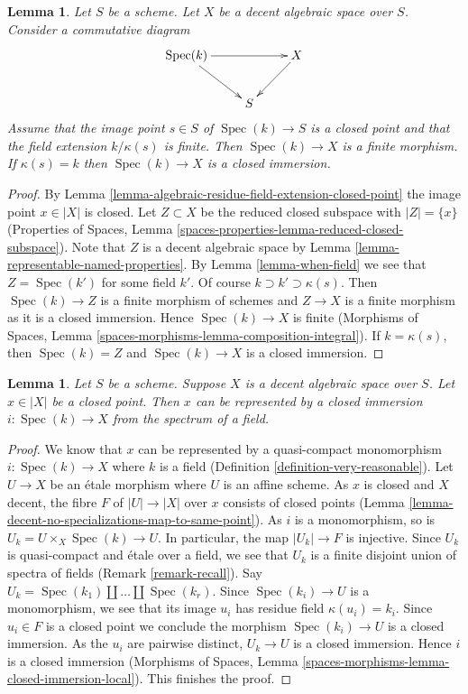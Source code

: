 \documentclass{stacks-project}
\theoremstyle{plain}
\newtheorem{lemma}[subsection]{Lemma}
\theoremstyle{definition}
\theoremstyle{remark}
\numberwithin{equation}{subsection}
\def\Spec{\mathop{\mathrm{Spec}}}
\begin{document}
\begin{lemma}
\label{lemma-finite-residue-field-extension-finite}
Let $S$ be a scheme. Let $X$ be a decent algebraic space over $S$.
Consider a commutative diagram
$$
\xymatrix{
\Spec(k) \ar[rr] \ar[rd] & & X \ar[ld] \\
& S
}
$$
Assume that the image point $s \in S$ of $\Spec(k) \to S$ is
a closed point and that the field extension $k/\kappa(s)$ is finite.
Then $\Spec(k) \to X$ is a finite morphism. If $\kappa(s) = k$
then $\Spec(k) \to X$ is a closed immersion.
\end{lemma}

\begin{proof}
By Lemma \ref{lemma-algebraic-residue-field-extension-closed-point}
the image point $x \in |X|$ is closed. Let $Z \subset X$ be the
reduced closed subspace with $|Z| = \{x\}$ (Properties of Spaces,
Lemma \ref{spaces-properties-lemma-reduced-closed-subspace}).
Note that $Z$ is a decent algebraic space by
Lemma \ref{lemma-representable-named-properties}.
By Lemma \ref{lemma-when-field} we see that $Z = \Spec(k')$
for some field $k'$. Of course $k \supset k' \supset \kappa(s)$.
Then $\Spec(k) \to Z$ is a finite morphism of schemes
and $Z \to X$ is a finite morphism as it is a closed immersion.
Hence $\Spec(k) \to X$ is finite (Morphisms of Spaces, Lemma
\ref{spaces-morphisms-lemma-composition-integral}).
If $k = \kappa(s)$, then $\Spec(k) = Z$ and $\Spec(k) \to X$
is a closed immersion.
\end{proof}

\begin{lemma}
\label{lemma-decent-space-closed-point}
Let $S$ be a scheme. Suppose $X$ is a decent algebraic space over $S$.
Let $x \in |X|$ be a closed point. Then $x$ can be represented by a
closed immersion $i : \Spec(k) \to X$ from the spectrum of a field.
\end{lemma}

\begin{proof}
We know that $x$ can be represented by a quasi-compact monomorphism
$i : \Spec(k) \to X$ where $k$ is a field
(Definition \ref{definition-very-reasonable}).
Let $U \to X$ be an \'etale morphism where $U$ is an affine scheme.
As $x$ is closed and $X$ decent, the fibre $F$ of $|U| \to |X|$ over $x$
consists of closed points
(Lemma \ref{lemma-decent-no-specializations-map-to-same-point}).
As $i$ is a monomorphism, so is $U_k = U \times_X \Spec(k) \to U$.
In particular, the map $|U_k| \to F$ is injective. Since $U_k$
is quasi-compact and \'etale over a field, we see that $U_k$ is a
finite disjoint union of spectra of fields (Remark \ref{remark-recall}).
Say $U_k = \Spec(k_1) \amalg \ldots \amalg \Spec(k_r)$.
Since $\Spec(k_i) \to U$ is a monomorphism, we see that
its image $u_i$ has residue field $\kappa(u_i) = k_i$.
Since $u_i \in F$ is a closed point we conclude the morphism
$\Spec(k_i) \to U$ is a closed immersion. As the $u_i$ are pairwise distinct,
$U_k \to U$ is a closed immersion. Hence $i$ is a closed immersion
(Morphisms of Spaces, Lemma
\ref{spaces-morphisms-lemma-closed-immersion-local}). This finishes the proof.
\end{proof}
\end{document}
